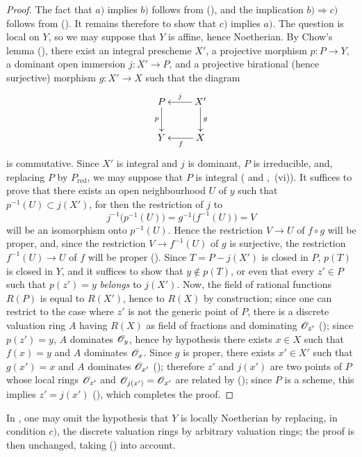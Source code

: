 \begin{proof}
The fact that $a)$ implies $b)$ follows from (), and the implication $b)\Rightarrow c)$ follows from ().
It remains therefore to show that $c)$ implies $a)$.
The question is local on $Y$, so we may suppose that $Y$ is affine, hence Noetherian. By Chow's lemma (), there exist an integral prescheme $X'$, a projective morphism $p:P\to Y$, a dominant open immersion $j:X'\to P$, and a projective birational (hence surjective) morphism $g:X'\to X$ such that the diagram
\[
  \xymatrix{
    P \ar[d]_-{p} & X' \ar[l]_-{j} \ar[d]^-{g} \\
    Y & X \ar[l]^-{f}
  }
\]
is commutative.
Since $X'$ is integral and $j$ is dominant, $P$ is irreducible, and, replacing $P$ by $P_\mathrm{red}$, we may suppose that $P$ is integral ( and ,~(vi)).
It suffices to prove that there exists an open neighbourhood $U$ of $y$ such that $p^{-1}(U)\subset j(X')$, for then the restriction of $j$ to
\[
  j^{-1}\bigl(p^{-1}(U)\bigr)=g^{-1}\bigl(f^{-1}(U)\bigr)=V
\]
will be an isomorphism onto $p^{-1}(U)$. Hence the restriction $V\to U$ of $f\circ g$ will be proper, and, since the restriction $V\to f^{-1}(U)$ of $g$ is surjective, the restriction $f^{-1}(U)\to U$ of $f$ will be proper ().
Since $T=P-j(X')$ is closed in $P$, $p(T)$ is closed in $Y$, and it suffices to show that $y\notin p(T)$, or even that every $z'\in P$ such that $p(z')=y$ \emph{belongs} to $j(X')$.
Now, the field of rational functions $R(P)$ is equal to $R(X')$, hence to $R(X)$ by construction; since one can restrict to the case where $z'$ is not the generic point of $P$, there is a discrete valuation ring $A$ having $R(X)$ as field of fractions and dominating $\mathscr{O}_{z'}$ (); since $p(z')=y$, $A$ dominates $\mathscr{O}_y$, hence by hypothesis there exists $x\in X$ such that $f(x)=y$ and $A$ dominates $\mathscr{O}_x$.
Since $g$ is proper, there exists $x'\in X'$ such that $g(x')=x$ and $A$ dominates $\mathscr{O}_{x'}$ (); therefore $z'$ and $j(x')$ are two points of $P$ whose local rings $\mathscr{O}_{z'}$ and $\mathscr{O}_{j(x')}=\mathscr{O}_{x'}$ are related by (); since $P$ is a scheme, this implies $z'=j(x')$ (), which completes the proof.
\end{proof}

\begin{remark}[15.7.3]
\label{IV.15.7.3}
In , one may omit the hypothesis that $Y$ is locally Noetherian by replacing, in condition $c)$, the discrete valuation rings by arbitrary valuation rings; the proof is then unchanged, taking () into account.
\end{remark}

